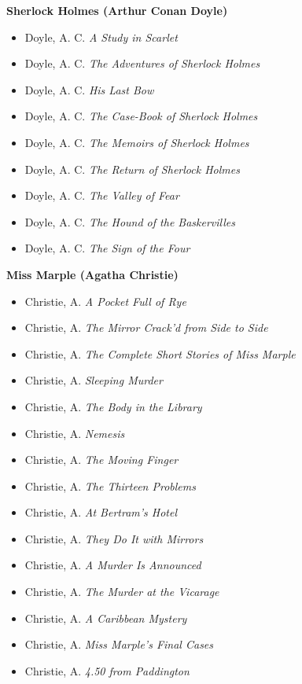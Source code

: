 \documentclass{article}
\begin{document}
\begin{appendices}
\textbf{Sherlock Holmes (Arthur Conan Doyle)}
\begin{itemize}[itemsep=0pt, parsep=0pt, topsep=2pt, partopsep=0pt]
    \item Doyle, A. C. \textit{A Study in Scarlet}
    \item Doyle, A. C. \textit{The Adventures of Sherlock Holmes}
    \item Doyle, A. C. \textit{His Last Bow}
    \item Doyle, A. C. \textit{The Case-Book of Sherlock Holmes}
    \item Doyle, A. C. \textit{The Memoirs of Sherlock Holmes}
    \item Doyle, A. C. \textit{The Return of Sherlock Holmes}
    \item Doyle, A. C. \textit{The Valley of Fear}
    \item Doyle, A. C. \textit{The Hound of the Baskervilles}
    \item Doyle, A. C. \textit{The Sign of the Four}
\end{itemize}

\textbf{Miss Marple (Agatha Christie)}
\begin{itemize}[itemsep=0pt, parsep=0pt, topsep=2pt, partopsep=0pt]
    \item Christie, A. \textit{A Pocket Full of Rye}
    \item Christie, A. \textit{The Mirror Crack'd from Side to Side}
    \item Christie, A. \textit{The Complete Short Stories of Miss Marple}
    \item Christie, A. \textit{Sleeping Murder}
    \item Christie, A. \textit{The Body in the Library}
    \item Christie, A. \textit{Nemesis}
    \item Christie, A. \textit{The Moving Finger}
    \item Christie, A. \textit{The Thirteen Problems}
    \item Christie, A. \textit{At Bertram's Hotel}
    \item Christie, A. \textit{They Do It with Mirrors}
    \item Christie, A. \textit{A Murder Is Announced}
    \item Christie, A. \textit{The Murder at the Vicarage}
    \item Christie, A. \textit{A Caribbean Mystery}
    \item Christie, A. \textit{Miss Marple's Final Cases}
    \item Christie, A. \textit{4.50 from Paddington}
\end{itemize}


\end{appendices}
\end{document}
